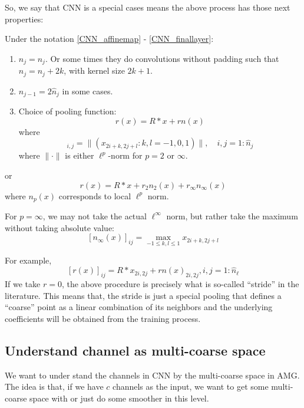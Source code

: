 So, we say that CNN is a special cases means the above process has those next properties:
\begin{properties} Under the notation  \eqref{CNN_affinemap} - \eqref{CNN_finallayer}:
	\begin{enumerate}
		\item $\hat n_{j} = n_j$. Or some times they do convolutions without padding such that $\hat n_{j} = n_j + 2k$, with kernel size $2k+1$.
		
		\item $n_{j-1} = 2 \hat n_j$ in some cases. 
		\item Choice of pooling function:
		\begin{equation}
		\label{pooling}
		r(x)=R\ast x+rn(x)
		\end{equation}
		where 
		\begin{equation}
		[n(x)]_{i,j}=\| (x_{2i+k,2j+l}: k,l=-1,0,1)\|, \quad i,j=1:\hat n_j
		\end{equation}
		where $\|\cdot\|$ is either $\ell^p$-norm for $p=2$ or $\infty$. 
	\end{enumerate}
	or 
	\begin{equation}
	\label{pooling2}
	r(x)=R\ast x+r_2 n_2(x)+r_\infty n_\infty(x)
	\end{equation}
	where $n_p(x)$ corresponds to local $\ell^p$ norm.
\end{properties}
For $p=\infty$, we may not take the actual $\ell^\infty$ norm, but
rather take the maximum without taking absolute value:
$$
[n_\infty(x)]_{ij}=\max_{-1\le k,l\le 1} x_{2i+k, 2j+l}
$$

For example, 
\begin{equation}
\label{stride-pooling}
[r(x)]_{ij}=R\ast x_{2i,2j}+rn(x)_{2i,2j}, i, j=1:\hat n_{\ell}
\end{equation}
If we take $r=0$,  the above procedure is precisely what is so-called
``stride'' in the literature.   This means that, the stride is just a
special pooling that defines a ``coarse'' point as a linear
combination of its neighbors and the underlying coefficients will be
obtained from the training process. 

\subsection{Understand channel as multi-coarse space}
We want to under stand the channels in CNN by the multi-coarse space in AMG. The idea is that, if we have $c$ channels as the input, we want to get some multi-coarse space with or just do some smoother in this level.

